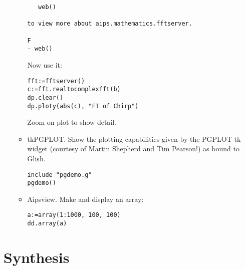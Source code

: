 \begin{itemize}
\begin{itemize}
\begin{verbatim}
   web()

to view more about aips.mathematics.fftserver.

F 
- web()
\end{verbatim}
Now use it:
\begin{verbatim}
fft:=fftserver()
c:=fft.realtocomplexfft(b)
dp.clear()
dp.ploty(abs(c), "FT of Chirp")
\end{verbatim}
Zoom on plot to show detail.
\item tkPGPLOT. Show the plotting capabilities given by the
PGPLOT tk widget (courtesy of Martin Shepherd and Tim Pearson!)
as bound to Glish. 
\begin{verbatim}
include "pgdemo.g"
pgdemo()
\end{verbatim}
\item Aipsview. Make and display an array:
\begin{verbatim}
a:=array(1:1000, 100, 100)
dd.array(a)
\end{verbatim}
\end{itemize}
\end{itemize}


\section{Synthesis}

